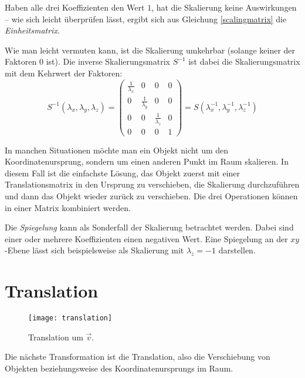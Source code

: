 Haben alle drei Koeffizienten den Wert $1$, hat die Skalierung keine Auswirkungen -- wie sich leicht überprüfen lässt, ergibt sich aus Gleichung \ref{scalingmatrix} die \emph{Einheitsmatrix}.

Wie man leicht vermuten kann, ist die Skalierung umkehrbar (solange keiner der Faktoren 0 ist). Die inverse Skalierungsmatrix $S^{-1}$ ist dabei die Skalierungsmatrix mit dem Kehrwert der Faktoren:
\begin{equation}
 S^{-1}{(\lambda_x, \lambda_y, \lambda_z)} =
 \begin{pmatrix}
  \frac{1}{\lambda_x} & 0 & 0 & 0 \\
  0 & \frac{1}{\lambda_y} & 0 & 0 \\
  0 & 0 & \frac{1}{\lambda_z} & 0 \\
  0 & 0 & 0 & 1
 \end{pmatrix}
 = S{(\lambda_x^{-1}, \lambda_y^{-1}, \lambda_z^{-1})}
\end{equation}


In manchen Situationen möchte man ein Objekt nicht um den Koordinatenursprung, sondern um einen anderen Punkt im Raum skalieren. In diesem Fall ist die einfachste Lösung, das Objekt zuerst mit einer Translationsmatrix in den Ursprung zu verschieben, die Skalierung durchzuführen und dann das Objekt wieder zurück zu verschieben. Die drei Operationen können in einer Matrix kombiniert werden.


Die \emph{Spiegelung} kann als Sonderfall der Skalierung betrachtet werden. Dabei sind einer oder mehrere Koeffizienten einen negativen Wert. Eine Spiegelung an der $xy$-Ebene lässt sich beispielsweise als Skalierung mit $\lambda_z = -1$ darstellen.

\section{Translation}
\label{translation}

\begin{wrapfigure}{r}{0.5\textwidth}
  \texttt{[image: translation]}
  \vspace{-10pt}
  \caption{Translation um $\vec v$.}
\end{wrapfigure}

Die nächste Transformation ist die Translation, also die Verschiebung von Objekten beziehungsweise des Koordinatenursprungs im Raum.

